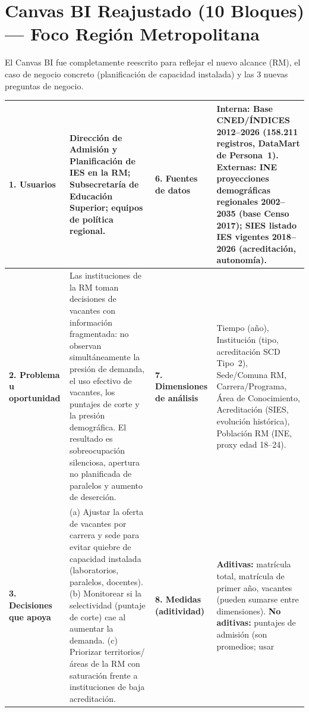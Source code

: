 \documentclass[11pt,a4paper]{article}
\begin{document}
\section{Canvas BI Reajustado (10 Bloques) — Foco Región Metropolitana}
\label{sec:canvas}

El Canvas BI fue completamente reescrito para reflejar el nuevo alcance
(RM), el caso de negocio concreto (planificación de capacidad instalada)
y las 3 nuevas preguntas de negocio.

\begin{center}
\small
\begin{tabularx}{\textwidth}{|>{}p{3.0cm}|Y|>{}p{3.0cm}|Y|}
\hline
\textbf{\color{primaryblue}1. Usuarios} &
  Dirección de Admisión y Planificación de IES en la RM;
  Subsecretaría de Educación Superior;
  equipos de política regional. &
\textbf{\color{primaryblue}6. Fuentes de datos} &
  \textbf{Interna:} Base CNED/ÍNDICES 2012--2026 (158.211 registros,
  DataMart de Persona~1).
  \textbf{Externas:} INE proyecciones demográficas regionales 2002--2035
  (base Censo 2017); SIES listado IES vigentes 2018--2026 (acreditación,
  autonomía). \\
\hline
\textbf{\color{primaryblue}2. Problema u oportunidad} &
  Las instituciones de la RM toman decisiones de vacantes con información
  fragmentada: no observan simultáneamente la presión de demanda,
  el uso efectivo de vacantes, los puntajes de corte y la presión
  demográfica. El resultado es sobreocupación silenciosa, apertura
  no planificada de paralelos y aumento de deserción. &
\textbf{\color{primaryblue}7. Dimensiones de análisis} &
  Tiempo (año),
  Institución (tipo, acreditación SCD Tipo~2),
  Sede/Comuna RM,
  Carrera/Programa,
  Área de Conocimiento,
  Acreditación (SIES, evolución histórica),
  Población RM (INE, proxy edad 18--24). \\
\hline
\textbf{\color{primaryblue}3. Decisiones que apoya} &
  (a) Ajustar la oferta de vacantes por carrera y sede para evitar quiebre
  de capacidad instalada (laboratorios, paralelos, docentes).
  (b) Monitorear si la selectividad (puntaje de corte) cae al aumentar
  la demanda.
  (c) Priorizar territorios/áreas de la RM con saturación frente a
  instituciones de baja acreditación. &
\textbf{\color{primaryblue}8. Medidas (aditividad)} &
  \textbf{Aditivas:} matrícula total, matrícula de primer año, vacantes
  (pueden sumarse entre dimensiones).
  \textbf{No aditivas:} puntajes de admisión (son promedios; usar

\end{tabularx}
\end{center}
\end{document}
